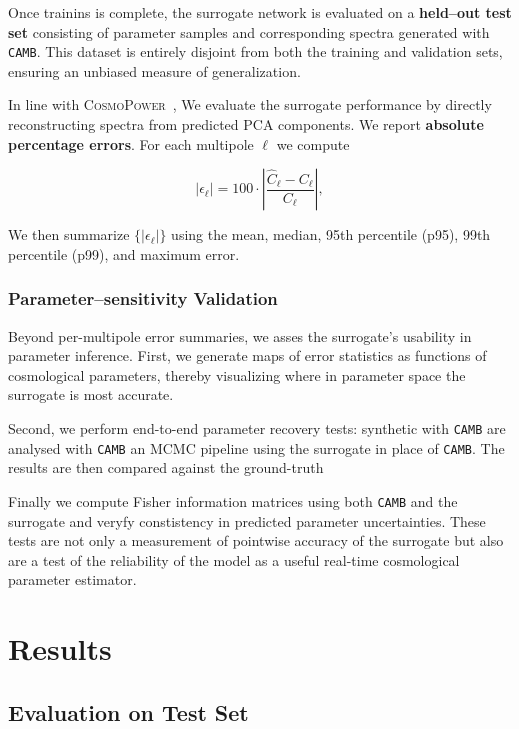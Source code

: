 \documentclass[11pt,a4paper]{article}
\numberwithin{equation}{section}
\begin{document}
Once trainins is complete, the surrogate network is evaluated on a \textbf{held–out test set} 
consisting of parameter samples and corresponding spectra generated with \texttt{CAMB}. 
This dataset is entirely disjoint from both the training and validation sets, ensuring an unbiased measure of generalization.

In line with \textsc{CosmoPower}~\cite{SpurioMancini2021}, 
We evaluate the surrogate performance by directly reconstructing spectra from predicted PCA components.
We report \textbf{absolute percentage errors}. For each multipole $\ell$ we compute

\[
|\epsilon_\ell| = 100 \cdot \left| \frac{\widehat{C}_\ell - C_\ell}{C_\ell} \right|,
\]

We then summarize $\{|\epsilon_\ell|\}$ using the mean, median, 95th percentile (p95), 99th percentile (p99), and maximum error.

\subsubsection{Parameter–sensitivity Validation}

Beyond per-multipole error summaries, we asses the surrogate's usability in parameter inference.
First, we generate maps of error statistics as functions of cosmological parameters,
thereby visualizing where in parameter space the surrogate is most accurate.

Second, we perform end-to-end parameter recovery tests: synthetic with \texttt{CAMB} 
are analysed with \texttt{CAMB} an MCMC pipeline using the surrogate in place of \texttt{CAMB}. 
The results are then compared against the ground-truth

Finally we compute Fisher information matrices using both \texttt{CAMB} and the surrogate and veryfy constistency
in predicted parameter uncertainties. These tests are not only a measurement of pointwise accuracy of the surrogate but also 
are a test of the reliability of the model as a useful real-time cosmological parameter estimator. 



\section{Results}
\label{sec:results}
\subsection{Evaluation on Test Set}
\end{document}
